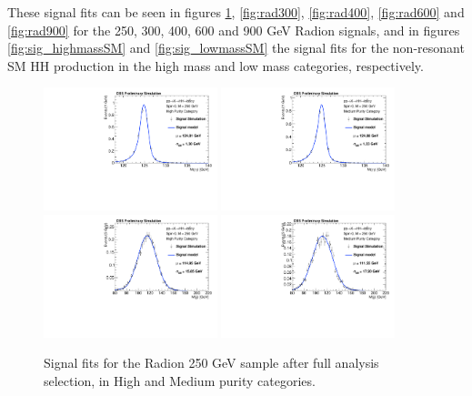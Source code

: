 These signal fits can be seen in figures \ref{fig:rad250}, \ref{fig:rad300}, \ref{fig:rad400}, \ref{fig:rad600} and \ref{fig:rad900} for the 250, 300, 400, 600 and 900 GeV Radion signals, and in figures \ref{fig:sig_highmassSM} and \ref{fig:sig_lowmassSM} the signal fits for the non-resonant SM HH production in the high mass and low mass categories, respectively.

\begin{figure}[h]
  \centering
  \includegraphics[width=0.45\textwidth]{figures/sec-signals/Rad250_signal_fit_mgg_cat0}\hfil
  \includegraphics[width=0.45\textwidth]{figures/sec-signals/Rad250_signal_fit_mgg_cat1}\hfil
  \includegraphics[width=0.45\textwidth]{figures/sec-signals/Rad250_signal_fit_mjj_cat0}\hfil
  \includegraphics[width=0.45\textwidth]{figures/sec-signals/Rad250_signal_fit_mjj_cat1}\hfil
  \caption{Signal fits for the Radion 250 GeV sample after full analysis selection, in High and Medium purity categories.}
  \label{fig:rad250}
\end{figure}

